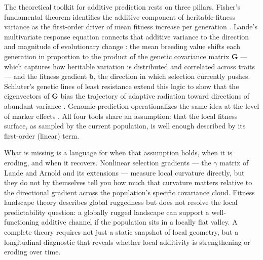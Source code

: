 \documentclass[9pt,twocolumn,twoside]{pnas-new}
\newcommand{\vect}[1]{\boldsymbol{#1}}
\newcommand{\mat}[1]{\mathbf{#1}}
\begin{document}
\Endparasplit

The theoretical toolkit for additive prediction rests on three
pillars.
Fisher's fundamental theorem identifies the additive component
of heritable fitness variance as the first-order driver of
mean fitness increase per generation \cite{Fisher1930,Price1972}.
Lande's multivariate response equation connects that additive
variance to the direction and magnitude of evolutionary change
\cite{Lande1979,LandeArnold1983}: the mean breeding value shifts
each generation in proportion to the product of the genetic
covariance matrix $\mat{G}$ --- which captures how heritable
variation is distributed and correlated across traits --- and the
fitness gradient $\vect{b}$, the direction in which selection
currently pushes.
Schluter's genetic lines of least resistance extend this logic to
show that the eigenvectors of $\mat{G}$ bias the trajectory of
adaptive radiation toward directions of abundant variance
\cite{Schluter1996,WalshBlows2009}.
Genomic prediction operationalizes the same idea at the level of
marker effects \cite{Meuwissen2001,VanRaden2008}.
All four tools share an assumption: that the local fitness surface,
as sampled by the current population, is well enough described by
its first-order (linear) term.

What is missing is a language for when that assumption holds,
when it is eroding, and when it recovers.
Nonlinear selection gradients --- the $\gamma$ matrix of
Lande and Arnold \cite{LandeArnold1983} and its extensions
\cite{PhillipsArnold1989} --- measure local curvature directly, but
they do not by themselves tell you how much that curvature matters
relative to the directional gradient across the population's
specific covariance cloud.
Fitness landscape theory \cite{WrightLandscape1932,Gavrilets2004}
describes global ruggedness but does not resolve the local
predictability question: a globally rugged landscape can support
a well-functioning additive channel if the population sits in a
locally flat valley.
A complete theory requires not just a static snapshot of local
geometry, but a longitudinal diagnostic that reveals whether
local additivity is strengthening or eroding over time.
\end{document}
